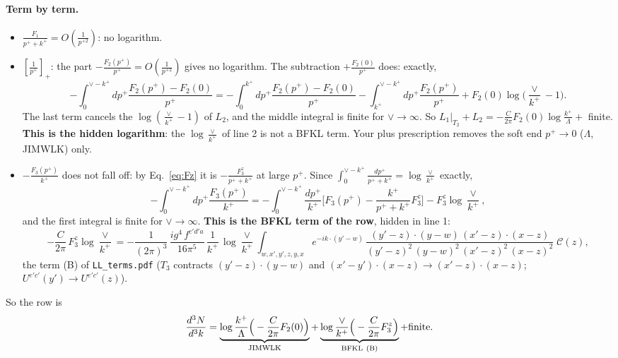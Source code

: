 \paragraph{Term by term.}
\begin{itemize}
\item $\frac{F_1}{p^++k^+}=O(\frac{1}{p^{+2}})$: no logarithm.
\item $\left[\frac{1}{p^+}\right]_+$: the part $-\frac{F_2(p^+)}{p^+}=O(\frac{1}{p^{+2}})$ gives no logarithm. The subtraction $+\frac{F_2(0)}{p^+}$ does: exactly,
\begin{equation*}
-\int_0^{\vee-k^+}dp^+\frac{F_2(p^+)-F_2(0)}{p^+}=-\int_0^{k^+}dp^+\frac{F_2(p^+)-F_2(0)}{p^+}-\int_{k^+}^{\vee-k^+}dp^+\frac{F_2(p^+)}{p^+}+F_2(0)\log\Big(\frac{\vee}{k^+}-1\Big).
\end{equation*}
The last term cancels the $\log(\frac{\vee}{k^+}-1)$ of $L_2$, and the middle integral is finite for $\vee\to\infty$. So $L_1|_{T_2}+L_2=-\frac{C}{2\pi}F_2(0)\log\frac{k^+}{\Lambda}+$ finite. \textbf{This is the hidden logarithm}: the $\log\frac{\vee}{k^+}$ of line 2 is not a BFKL term. Your plus prescription removes the soft end $p^+\to0$ ($\Lambda$, JIMWLK) only.
\item $-\frac{F_3(p^+)}{k^+}$ does not fall off: by Eq.~\eqref{eq:Fz} it is $-\frac{F_3^z}{p^++k^+}$ at large $p^+$. Since $\int_0^{\vee-k^+}\frac{dp^+}{p^++k^+}=\log\frac{\vee}{k^+}$ exactly,
\begin{equation*}
-\int_0^{\vee-k^+}dp^+\frac{F_3(p^+)}{k^+}=-\int_0^{\vee-k^+}\frac{dp^+}{k^+}\Big[F_3(p^+)-\frac{k^+}{p^++k^+}F_3^z\Big]-F_3^z\log\frac{\vee}{k^+},
\end{equation*}
and the first integral is finite for $\vee\to\infty$. \textbf{This is the BFKL term of the row}, hidden in line 1:
\begin{equation}
-\frac{C}{2\pi}\,F_3^z\log\frac{\vee}{k^+}=-\frac{1}{(2\pi)^{3}}\, \frac{ig^{4}\,f^{c'd'a}}{16\pi^{5}}\, \frac{1}{k^{+}}\,\log\frac{\vee}{k^{+}}\int_{w,x',y',z,y,x} e^{-ik\cdot (y'-w)}\,\frac{(y'-z)\cdot (y-w)\,(x'-z)\cdot (x-z)}{(y'-z)^{2}\,(y-w)^{2}\,(x'-z)^{2}\,(x-z)^{2}}\;\mathcal C(z),
\end{equation}
the term (B) of \texttt{LL\_terms.pdf} ($T_3$ contracts $(y'-z)\cdot(y-w)$ and $(x'-y')\cdot(x-z)\to(x'-z)\cdot(x-z)$; $U^{e'c'}(y')\to U^{e'c'}(z)$).
\end{itemize}
So the row is
\begin{equation}
\frac{d^3N}{d^3k}=\underbrace{\log\frac{k^+}{\Lambda}\Big(-\frac{C}{2\pi}F_2(0)\Big)}_{\rm JIMWLK}+\underbrace{\log\frac{\vee}{k^+}\Big(-\frac{C}{2\pi}F_3^z\Big)}_{\rm BFKL\ (B)}+\text{finite}.
\end{equation}
